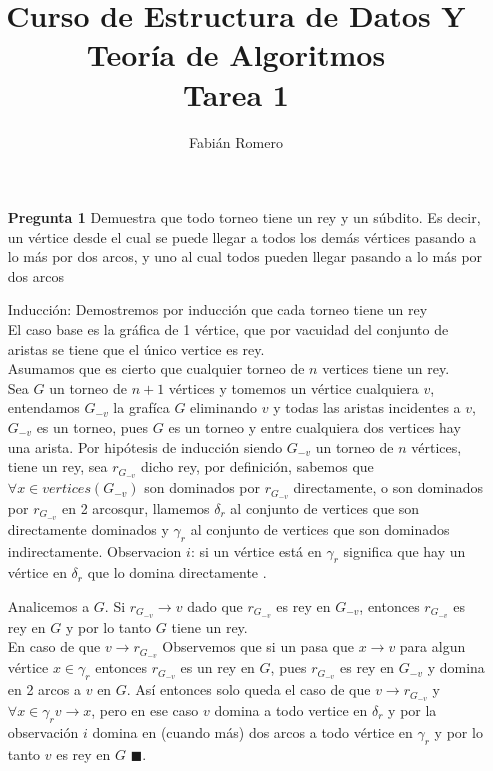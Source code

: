 \documentclass[12pt]{article}
\title{Curso de Estructura de Datos Y Teoría de Algoritmos\\
Tarea 1 }
\author{Fabián Romero}
\begin{document}
\lstset{language=python}
\maketitle

\begin{itemize}
  \item[\bf{Pregunta 1}] Demuestra que todo torneo tiene un rey y un súbdito. Es decir, un vértice desde el cual se puede llegar a todos los demás vértices pasando a lo más por dos arcos, y uno al cual todos pueden llegar pasando a lo más por dos arcos

  \item[Inducción:] 
    Demostremos por inducción que cada torneo tiene un rey\\
    El caso base es la gráfica de 1 vértice, que por vacuidad del conjunto de aristas se tiene que el único vertice es rey.\\
    Asumamos que es cierto que cualquier torneo de $n$ vertices tiene un rey.\\
    Sea $G$ un torneo de $n+1$ vértices y tomemos un vértice cualquiera $v$, entendamos $G_{-v}$ la grafíca $G$ eliminando $v$ y todas las aristas incidentes a $v$, $G_{-v}$ es un torneo, pues $G$ es un torneo y entre cualquiera dos vertices hay una arista.
    Por hipótesis de inducción siendo $G_{-v}$ un torneo de $n$ vértices, tiene un rey, sea $r_{G_{-v}}$ dicho rey, por definición, sabemos que $\forall x \in vertices(G_{-v})$ son dominados por $r_{G_{-v}}$ directamente, o son dominados por $r_{G_{-v}}$ en 2 arcosqur, llamemos $\delta_{r}$ al conjunto de vertices que son directamente dominados y $\gamma_{r}$ al conjunto de vertices que son dominados indirectamente.  Observacion $i$:  si un vértice está en $\gamma_{r}$ significa que hay un vértice en $\delta_{r}$ que lo domina directamente .

Analicemos a $G$.
Si $r_{G_{-v}} \rightarrow v$ dado que $r_{G_{-v}}$ es rey en $G_{-v}$, entonces $r_{G_{-v}}$ es rey en $G$ y por lo tanto $G$ tiene un rey.\\
En caso de que $v \rightarrow r_{G_{-v}}$ Observemos que si un pasa que $x \rightarrow v$ para algun vértice $x \in \gamma_{r}$ entonces $r_{G_{-v}}$ es un rey en $G$, pues $r_{G_{-v}}$ es rey en  $G_{-v}$ y domina en 2 arcos a $v$ en $G$.
Así entonces solo queda el caso de que $v \rightarrow r_{G_{-v}}$ y $\forall x \in \gamma_{r}  v \rightarrow x$, pero en ese caso $v$ domina a todo vertice en $\delta_{r}$ y por la observación $i$ domina en (cuando más) dos arcos a todo vértice en $\gamma_{r}$ y por lo tanto $v$ es rey en $G$ $\blacksquare$.\\


\end{itemize}
\end{document}
